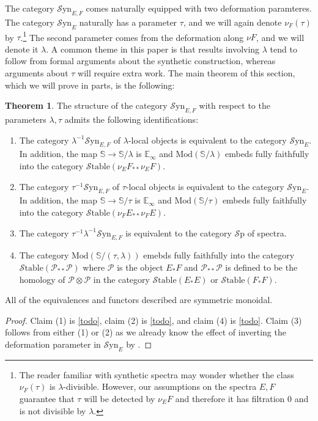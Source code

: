 \documentclass[10pt]{amsart}
\theoremstyle{definition}
\numberwithin{figure}{section}
\numberwithin{equation}{section}
\newtheorem{theorem}[figure]{Theorem}
\newcommand{\cP}{\mathcal{P}}
\theoremstyle{cited}
\newcommand{\bS}{\mathbb{S}}
\newcommand{\bE}{\mathbb{E}}
\newcommand{\Sp}{{\mathcal{S}\mathrm{p}}}
\newcommand{\Mod}{\mathrm{Mod}}
\newcommand{\Syn}{\mathcal{S}\mathrm{yn}}
\newcommand{\Stable}{\mathcal{S}\mathrm{table}}
\begin{document}
The category $\Syn_{E,F}$ comes naturally equipped with two deformation paramteres. The category $\Syn_E$ naturally has a parameter $\tau$, and we will again denote $\nu_{F}(\tau)$ by $\tau$.\footnote{The reader familiar with synthetic spectra may wonder whether the class $\nu_F(\tau)$ is $\lambda$-divisible. However, our assumptions on the spectra $E,F$ guarantee that $\tau$ will be detected by $\nu_E F$ and therefore it has filtration $0$ and is not divisible by $\lambda$.} The second parameter comes from the deformation along $\nu F$, and we will denote it $\lambda$. A common theme in this paper is that results involving $\lambda$ tend to follow from formal arguments about the synthetic construction, whereas arguments about $\tau$ will require extra work. The main theorem of this section, which we will prove in parts, is the following:

\begin{theorem}
  The structure of the category $\Syn_{E,F}$ with respect to the parameters $\lambda, \tau$ admits the following identifications:

  \begin{enumerate}
    \item The category $\lambda^{-1}\Syn_{E,F}$ of $\lambda$-local objects is equivalent to the category $\Syn_E$. In addition, the map $\bS\to \bS/\lambda$ is $\bE_\infty$ and $\Mod(\bS/\lambda)$ embeds fully faithfully into the category $\Stable(\nu_E F_{**}\nu_E F)$.
    \item The category $\tau^{-1}\Syn_{E,F}$ of $\tau$-local objects is equivalent to the category $\Syn_E$. In addition, the map $\bS\to \bS/\tau$ is $\bE_\infty$ and $\Mod(\bS/\tau)$ embeds fully faithfully into the category $\Stable(\nu_F E_{**}\nu_F E)$.
    \item The category $\tau^{-1}\lambda^{-1}\Syn_{E,F}$ is equivalent to the category $\Sp$ of spectra.
    \item The category $\Mod(\bS/(\tau,\lambda))$ emebds fully faithfully into the category $\Stable(\cP_{**}\cP)$ where $\cP$ is the object $E_*F$ and $\cP_{**}\cP$ is defined to be the homology of $\cP\otimes \cP$ in the category $\Stable(E_*E)$ or $\Stable(F_*F)$.
  \end{enumerate}
  All of the equivalences and functors described are symmetric monoidal.
  
\end{theorem}

\begin{proof}
  Claim (1) is \ref{todo}, claim (2) is \ref{todo}, and claim (4) is \ref{todo}. Claim (3) follows from either (1) or (2) as we already know the effect of inverting the deformation parameter in $\Syn_E$ by \cite{todo}.
\end{proof}
\end{document}
